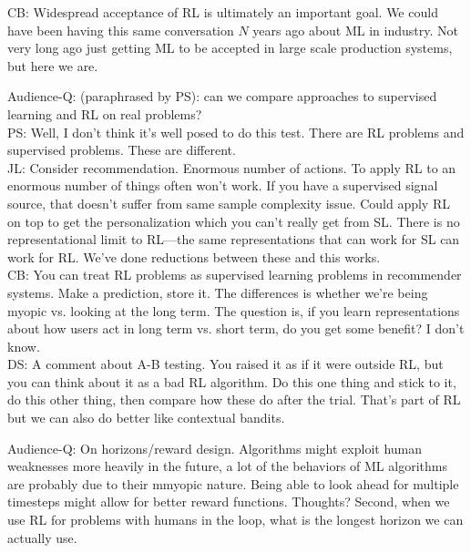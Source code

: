 CB: Widespread acceptance of RL is ultimately an important goal. We could have been having this same conversation $N$ years ago about ML in industry. Not very long ago just getting ML to be accepted in large scale production systems, but here we are. \\

\spacerule 

Audience-Q: (paraphrased by PS): can we compare approaches to supervised learning and RL on real problems? \\

PS: Well, I don't think it's well posed to do this test. There are RL problems and supervised problems. These are different. \\

JL: Consider recommendation. Enormous number of actions. To apply RL to an enormous number of things often won't work. If you have a supervised signal source, that doesn't suffer from same sample complexity issue. Could apply RL on top to get the personalization which you can't really get from SL. There is no representational limit to RL---the same representations that can work for SL can work for RL. We've done reductions between these and this works. \\

CB: You can treat RL problems as supervised learning problems in recommender systems. Make a prediction, store it. The differences is whether we're being myopic vs. looking at the long term. The question is, if you learn representations about how users act in long term vs. short term, do you get some benefit? I don't know. \\

DS: A comment about A-B testing. You raised it as if it were outside RL, but you can think about it as a bad RL algorithm. Do this one thing and stick to it, do this other thing, then compare how these do after the trial. That's part of RL but we can also do better like contextual bandits. \\

\spacerule

Audience-Q: On horizons/reward design. Algorithms might exploit human weaknesses more heavily in the future, a lot of the behaviors of ML algorithms are probably due to their mmyopic nature. Being able to look ahead for multiple timesteps might allow for better reward functions. Thoughts? Second, when we use RL for problems with humans in the loop, what is the longest horizon we can actually use. \\

